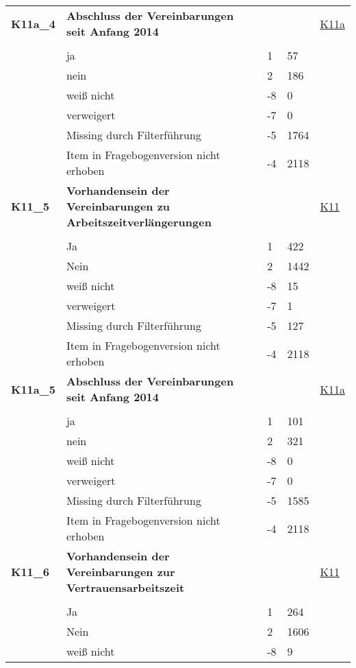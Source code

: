 \begin{longtable}{| L{2.5cm} | L{8.25cm}| C{1.5cm} | R{1.25cm} | C{2.25cm} |  }
   \midrule
\textbf{K11a\_4}\label{var:suf:K11a:4} & \textbf{Abschluss der Vereinbarungen seit Anfang 2014} &  &  & \hyperref[K11a]{K11a} \\ 
   &  &  &  &  \\ 
   & ja & 1 & 57 &  \\ 
   & nein & 2 & 186 &  \\ 
   & weiß nicht & -8 & 0 &  \\ 
   & verweigert & -7 & 0 &  \\ 
   & Missing durch Filterführung & -5 & 1764 &  \\ 
   & Item in Fragebogenversion nicht erhoben & -4 & 2118 &  \\ 
   \midrule
\textbf{K11\_5}\label{var:suf:K11:5} & \textbf{Vorhandensein der Vereinbarungen zu Arbeitszeitverlängerungen} &  &  & \hyperref[K11]{K11} \\ 
   &  &  &  &  \\ 
   & Ja & 1 & 422 &  \\ 
   & Nein & 2 & 1442 &  \\ 
   & weiß nicht & -8 & 15 &  \\ 
   & verweigert & -7 & 1 &  \\ 
   & Missing durch Filterführung & -5 & 127 &  \\ 
   & Item in Fragebogenversion nicht erhoben & -4 & 2118 &  \\ 
   \midrule
\textbf{K11a\_5}\label{var:suf:K11a:5} & \textbf{Abschluss der Vereinbarungen seit Anfang 2014} &  &  & \hyperref[K11a]{K11a} \\ 
   &  &  &  &  \\ 
   & ja & 1 & 101 &  \\ 
   & nein & 2 & 321 &  \\ 
   & weiß nicht & -8 & 0 &  \\ 
   & verweigert & -7 & 0 &  \\ 
   & Missing durch Filterführung & -5 & 1585 &  \\ 
   & Item in Fragebogenversion nicht erhoben & -4 & 2118 &  \\ 
   \midrule
\textbf{K11\_6}\label{var:suf:K11:6} & \textbf{Vorhandensein der Vereinbarungen zur Vertrauensarbeitszeit} &  &  & \hyperref[K11]{K11} \\ 
   &  &  &  &  \\ 
   & Ja & 1 & 264 &  \\ 
   & Nein & 2 & 1606 &  \\ 
   & weiß nicht & -8 & 9 &  \\ 

\end{longtable}
